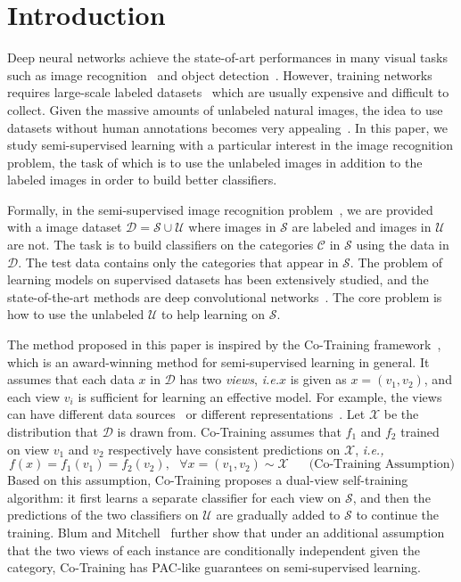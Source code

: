 \documentclass[runningheads]{llncs}
\begin{document}
\vspace{-0.3in}\section{Introduction}%
Deep neural networks achieve the state-of-art performances in many visual tasks such as
image recognition~\cite{resnet,densenet,alexnet,fewshot,vggnet,GoogleNet,sort,znfnet,gunn} and
object detection~\cite{deeplab,rich,fcnn,fasterrcnn}.
However, training networks requires large-scale labeled datasets~\cite{ILSVRC15,coco} which are usually expensive and difficult to collect.
Given the massive amounts of unlabeled natural images, the idea to use datasets without human annotations becomes very appealing~\cite{ssl}.
In this paper, we study semi-supervised learning with a particular interest in the image recognition problem, the task of which is to use the unlabeled images in addition to the labeled images in order to build better classifiers.

Formally, in the semi-supervised image recognition problem~\cite{stoc_trans,tessl,badgan}, we are provided with a image dataset $\mathcal{D}=\mathcal{S}\cup\mathcal{U}$ where images in $\mathcal{S}$ are labeled and images in $\mathcal{U}$ are not.
The task is to build classifiers on the categories $\mathcal{C}$ in $\mathcal{S}$ using the data in $\mathcal{D}$.
The test data contains only the categories that appear in $\mathcal{S}$.
The problem of learning models on supervised datasets has been extensively studied, and the state-of-the-art methods are deep convolutional networks~\cite{resnet,densenet}.
The core problem is how to use the unlabeled $\mathcal{U}$ to help learning on $\mathcal{S}$.

The method proposed in this paper is inspired by the Co-Training framework~\cite{CoT}, which is an award-winning method for semi-supervised learning in general.
It assumes that each data $x$ in $\mathcal{D}$ has two \textit{views}, \textit{i.e.}$x$ is given as $x=(v_1, v_2)$,
and each view $v_i$ is sufficient for learning an effective model.
For example, the views can have different data sources~\cite{CoT} or different representations~\cite{cotft,cotrans,cotbow}.
Let $\mathcal{X}$ be the distribution that $\mathcal{D}$ is drawn from.
Co-Training assumes that $f_1$ and $f_2$ trained on view $v_1$ and $v_2$ respectively have consistent predictions on $\mathcal{X}$, \textit{i.e.,}\begin{equation}\label{eq:cot_aspt}
  f(x)=f_1(v_1)=f_2(v_2),~~~\forall x = (v_1, v_2)\sim\mathcal{X} \text{~~~~~(Co-Training Assumption)}
\end{equation}
Based on this assumption, Co-Training proposes a dual-view self-training algorithm:
it first learns a separate classifier for each view on $\mathcal{S}$, and then the predictions of the two classifiers on $\mathcal{U}$ are gradually added to $\mathcal{S}$ to continue the training.
Blum and Mitchell~\cite{CoT} further show that under an additional assumption that the two views of each instance are conditionally independent given the category, Co-Training has PAC-like guarantees on semi-supervised learning.
\end{document}
